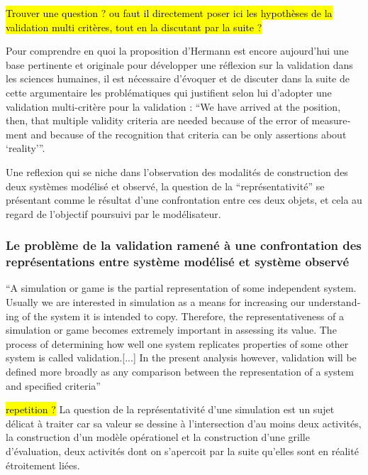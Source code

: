\hl{Trouver une question ? ou faut il directement poser ici les hypothèses de la validation multi critères, tout en la discutant par la suite ? }

Pour comprendre en quoi la proposition d'Hermann est encore aujourd'hui une base pertinente et originale pour développer une réflexion sur la validation dans les sciences humaines, il est nécessaire d'évoquer et de discuter dans la suite de cette argumentaire les problématiques qui justifient selon lui d'adopter une validation multi-critère pour la validation : \foreignquote{english}{We have arrived at the position, then, that multiple validity criteria are needed because of the error of measurement and because of the recognition that criteria can be only assertions about \enquote{reality}}. 

Une reflexion qui se niche dans l'observation des modalités de construction des deux systèmes modélisé et observé, la question de la \enquote{représentativité} se présentant comme le résultat d'une confrontation entre ces deux objets, et cela au regard de l'objectif poursuivi par le modélisateur.


\subsubsection{Le problème de la validation ramené à une confrontation des représentations entre système modélisé et système observé}
\label{ssec:confrontation_sysmodelise_sysobserve}

\foreignquote{english}{A simulation or game is the partial representation of some independent system. Usually we are interested in simulation as a means for increasing our understanding of the system it is intended to copy. Therefore, the representativeness of a simulation or game becomes extremely important in assessing its value. The process of determining how well one system replicates properties of some other system is called validation.[...] In the present analysis however, validation will be defined more broadly as any comparison between the representation of a system and specified criteria} \autocite[216]{Hermann1967}

\hl{repetition ?}
La question de la représentativité d'une simulation est un sujet délicat à traiter car sa valeur se dessine à l'intersection d'au moins deux activités, la construction d'un modèle opérationel et la construction d'une grille d'évaluation, deux activités dont on s'apercoit par la suite qu'elles sont en réalité étroitement liées. 

